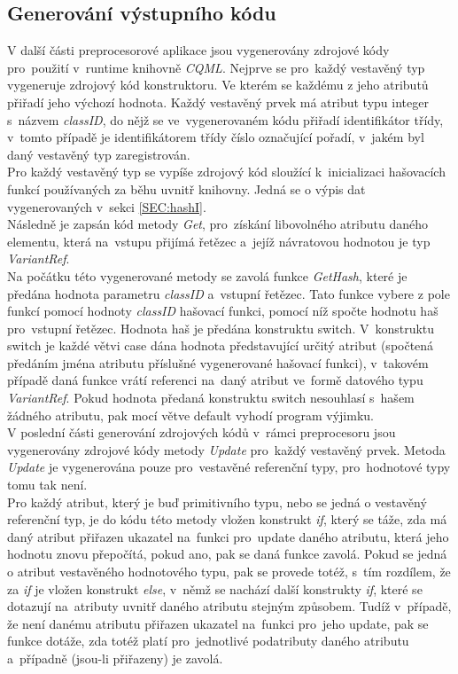 \documentclass[11pt,twoside,a4paper]{book}
\begin{document}
\subsection{\label{SEC:prepGen}Generování výstupního kódu}
V další části preprocesorové aplikace jsou vygenerovány zdrojové kódy pro~použití v~runtime knihovně \textit{CQML}.
Nejprve se pro~každý vestavěný typ vygeneruje zdrojový kód konstruktoru. Ve kterém se každému z jeho atributů přiřadí jeho výchozí hodnota. Každý vestavěný prvek má atribut typu integer s~názvem \textit{classID}, do nějž se ve~vygenerovaném kódu přiřadí identifikátor třídy, v~tomto případě je identifikátorem třídy číslo označující pořadí, v~jakém byl daný vestavěný typ zaregistrován.\\
Pro každý vestavěný typ se vypíše zdrojový kód sloužící k~inicializaci hašovacích funkcí používaných za běhu uvnitř knihovny. Jedná se o výpis dat vygenerovaných v~sekci \ref{SEC:hashI}.\\
Následně je zapsán kód metody \textit{Get}, pro~získání libovolného atributu daného elementu, která na~vstupu přijímá řetězec a~jejíž návratovou hodnotou je typ \textit{VariantRef}.\\
Na počátku této vygenerované metody se zavolá funkce \textit{GetHash}, které je předána hodnota parametru \textit{classID} a~vstupní řetězec. Tato funkce vybere z pole funkcí pomocí hodnoty \textit{classID} hašovací funkci, pomocí níž spočte hodnotu haš pro~vstupní řetězec. Hodnota haš je předána konstruktu switch. V~konstruktu switch je každé větvi case dána hodnota představující určitý atribut (spočtená předáním jména atributu příslušné vygenerované hašovací funkci), v~takovém případě daná funkce vrátí referenci na~daný atribut ve~formě datového typu \textit{VariantRef}. Pokud hodnota předaná konstruktu switch nesouhlasí s~hašem žádného atributu, pak mocí větve default vyhodí program výjimku.\\
V poslední části generování zdrojových kódů v~rámci preprocesoru jsou vygenerovány zdrojové kódy metody \textit{Update} pro~každý vestavěný prvek. Metoda \textit{Update} je vygenerována pouze pro~vestavěné referenční typy, pro~hodnotové typy tomu tak není. \\
Pro každý atribut, který je buď primitivního typu, nebo se jedná o vestavěný referenční typ, je do kódu této metody vložen konstrukt \textit{if}, který se táže, zda má daný atribut přiřazen ukazatel na~funkci pro~update daného atributu, která jeho hodnotu znovu přepočítá, pokud ano, pak se daná funkce zavolá.
Pokud se jedná o atribut vestavěného hodnotového typu, pak se provede totéž, s~tím rozdílem, že za \textit{if} je vložen konstrukt \textit{else}, v~němž se nachází další konstrukty \textit{if}, které se dotazují na~atributy uvnitř daného atributu stejným způsobem. Tudíž v~případě, že není danému atributu přiřazen ukazatel na~funkci pro~jeho update, pak se funkce dotáže, zda totéž platí pro~jednotlivé podatributy daného atributu a~případně (jsou-li přiřazeny) je zavolá.\\
\end{document}
